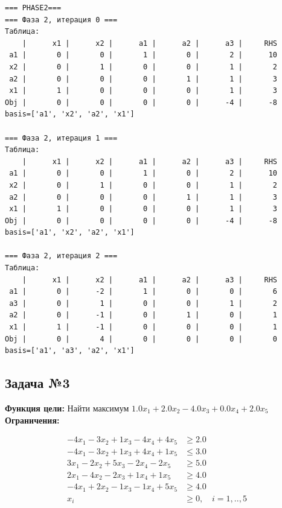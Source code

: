 \documentclass[a4paper,12pt]{article}
\begin{document}
\begin{verbatim}
=== PHASE2===
=== Фаза 2, итерация 0 ===
Таблица:
    |      x1 |      x2 |      a1 |      a2 |      a3 |     RHS
 a1 |       0 |       0 |       1 |       0 |       2 |      10
 x2 |       0 |       1 |       0 |       0 |       1 |       2
 a2 |       0 |       0 |       0 |       1 |       1 |       3
 x1 |       1 |       0 |       0 |       0 |       1 |       3
Obj |       0 |       0 |       0 |       0 |      -4 |      -8
basis=['a1', 'x2', 'a2', 'x1']

=== Фаза 2, итерация 1 ===
Таблица:
    |      x1 |      x2 |      a1 |      a2 |      a3 |     RHS
 a1 |       0 |       0 |       1 |       0 |       2 |      10
 x2 |       0 |       1 |       0 |       0 |       1 |       2
 a2 |       0 |       0 |       0 |       1 |       1 |       3
 x1 |       1 |       0 |       0 |       0 |       1 |       3
Obj |       0 |       0 |       0 |       0 |      -4 |      -8
basis=['a1', 'x2', 'a2', 'x1']

=== Фаза 2, итерация 2 ===
Таблица:
    |      x1 |      x2 |      a1 |      a2 |      a3 |     RHS
 a1 |       0 |      -2 |       1 |       0 |       0 |       6
 a3 |       0 |       1 |       0 |       0 |       1 |       2
 a2 |       0 |      -1 |       0 |       1 |       0 |       1
 x1 |       1 |      -1 |       0 |       0 |       0 |       1
Obj |       0 |       4 |       0 |       0 |       0 |       0
basis=['a1', 'a3', 'a2', 'x1']

\end{verbatim}



\subsection*{Задача №3}
\textbf{Функция цели: }
Найти максимум $ 1.0x_{1} +2.0x_{2} -4.0x_{3} +0.0x_{4} +2.0x_{5} $\\

\textbf{Ограничения:}

\[ \begin{aligned}
-4x_{1} -3x_{2} +1x_{3} -4x_{4} +4x_{5} &\ge 2.0 \\
-4x_{1} -3x_{2} +1x_{3} +4x_{4} +1x_{5} &\le 3.0 \\
3x_{1} -2x_{2} +5x_{3} -2x_{4} -2x_{5} &\ge 5.0 \\
2x_{1} -4x_{2} -2x_{3} +1x_{4} +1x_{5} &\ge 4.0 \\
-4x_{1} +2x_{2} -1x_{3} -1x_{4} +5x_{5} &\ge 4.0 \\
x_i &\ge 0,\quad i=1,..,5\\
\end{aligned}\]
\end{document}
